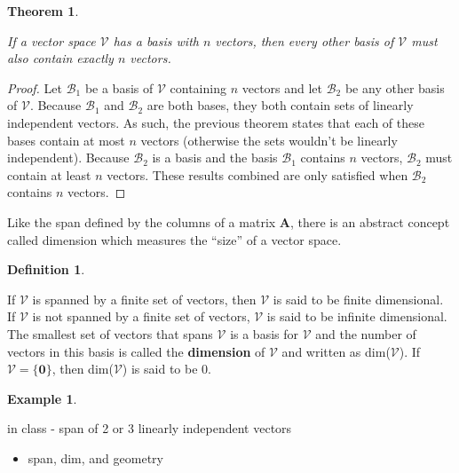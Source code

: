 \documentclass[
]{book}
\providecommand{\tightlist}{%
  \setlength{\itemsep}{0pt}\setlength{\parskip}{0pt}}
\newtheorem{theorem}{Theorem}[chapter]
\theoremstyle{definition}
\newtheorem{definition}{Definition}[chapter]
\theoremstyle{definition}
\newtheorem{example}{Example}[chapter]
\theoremstyle{definition}
\theoremstyle{remark}
\begin{document}
\begin{theorem}
\protect\hypertarget{thm:unlabeled-div-144}{}\label{thm:unlabeled-div-144}

If a vector space \({\mathcal{V}}\) has a basis with \(n\) vectors, then every other basis of \({\mathcal{V}}\) must also contain exactly \(n\) vectors.

\end{theorem}

\begin{proof}

Let \(\mathcal{B}_1\) be a basis of \({\mathcal{V}}\) containing \(n\) vectors and let \(\mathcal{B}_2\) be any other basis of \({\mathcal{V}}\). Because \(\mathcal{B}_1\) and \(\mathcal{B}_2\) are both bases, they both contain sets of linearly independent vectors. As such, the previous theorem states that each of these bases contain at most \(n\) vectors (otherwise the sets wouldn't be linearly independent). Because \(\mathcal{B}_2\) is a basis and the basis \(\mathcal{B}_1\) contains \(n\) vectors, \(\mathcal{B}_2\) must contain at least \(n\) vectors. These results combined are only satisfied when \(\mathcal{B}_2\) contains \(n\) vectors.

\end{proof}

Like the span defined by the columns of a matrix \(\mathbf{A}\), there is an abstract concept called dimension which measures the ``size'' of a vector space.

\begin{definition}
\protect\hypertarget{def:unlabeled-div-146}{}\label{def:unlabeled-div-146}

If \({\mathcal{V}}\) is spanned by a finite set of vectors, then \({\mathcal{V}}\) is said to be finite dimensional. If \({\mathcal{V}}\) is not spanned by a finite set of vectors, \({\mathcal{V}}\) is said to be infinite dimensional. The smallest set of vectors that spans \({\mathcal{V}}\) is a basis for \({\mathcal{V}}\) and the number of vectors in this basis is called the \textbf{dimension} of \({\mathcal{V}}\) and written as dim(\({\mathcal{V}}\)). If \({\mathcal{V}}= \{\mathbf{0}\}\), then dim(\({\mathcal{V}}\)) is said to be 0.

\end{definition}

\begin{example}
\protect\hypertarget{exm:unlabeled-div-147}{}\label{exm:unlabeled-div-147}

in class - span of 2 or 3 linearly independent vectors

\begin{itemize}
\tightlist
\item
  span, dim, and geometry
\end{itemize}

\end{example}
\end{document}
